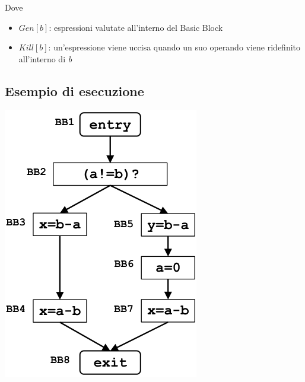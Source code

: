 \documentclass[10pt,a4paper]{article}
\begin{document}
Dove
\begin{itemize}
  \item $Gen[b]$: espressioni valutate all'interno del Basic Block
  \item $Kill[b]$: un'espressione viene uccisa quando un suo operando viene ridefinito all'interno di \textit{b}
\end{itemize}

\subsection{Esempio di esecuzione}

\begin{minipage}[c]{.25\textwidth}
  \includegraphics[width=\textwidth]{example-1.png}
\end{minipage}
\end{document}
